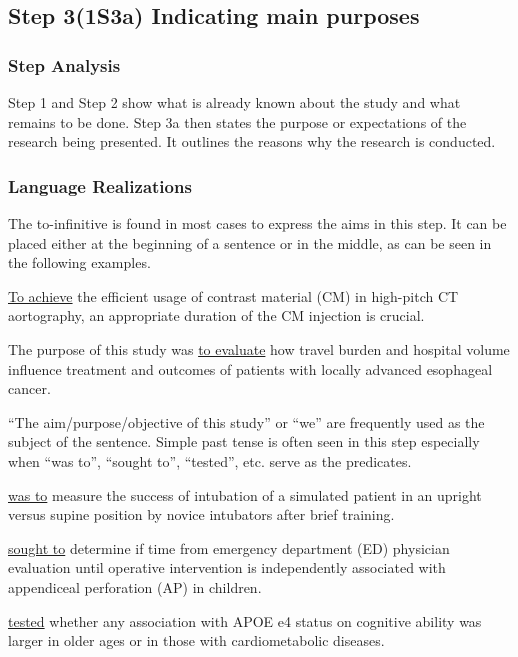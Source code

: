 \documentclass[a4paper]{ctexbook}
\begin{document}
  \subsection{Step 3(1S3a) Indicating main purposes}

    \subsubsection{Step Analysis}

    Step 1 and Step 2 show what is already known about the study and what remains to be done. Step 3a then states the purpose or expectations of the research being presented. It outlines the reasons why the research is conducted.

    \subsubsection{Language Realizations}

    The to-infinitive is found in most cases to express the aims in this step. It can be placed either at the beginning of a sentence or in the middle, as can be seen in the following examples.

    \begin{eg}{}
      \uline{To achieve} the efficient usage of contrast material (CM) in high-pitch CT aortography, an appropriate duration of the CM injection is crucial.
    \end{eg}

    \begin{eg}{}
      The purpose of this study was \uline{to evaluate} how travel burden and hospital volume influence treatment and outcomes of patients with locally advanced esophageal cancer.
    \end{eg}

    ``The aim/purpose/objective of this study'' or ``we'' are frequently used as the subject of the sentence. Simple past tense is often seen in this step especially when ``was to'', ``sought to'', ``tested'', etc. serve as the predicates.

    \begin{eg}{}
       \uline{was to} measure the success of intubation of a simulated patient in an upright versus supine position by novice intubators after brief training.
    \end{eg}
    \begin{eg}{}
       \uline{sought to} determine if time from emergency department (ED) physician evaluation until operative intervention is independently associated with appendiceal perforation (AP) in children.
    \end{eg}
    \begin{eg}{}
       \uline{tested} whether any association with APOE e4 status on cognitive ability was larger in older ages or in those with cardiometabolic diseases.
    \end{eg}
    
\end{document}
